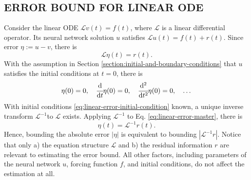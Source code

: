 \documentclass[accepted]{uai2023}
\newcommand{\dt}[1]{\cfrac{\mathrm{d} #1}{\mathrm{d} t}}
\newcommand{\dnt}[2]{\cfrac{\mathrm{d}^{#1} #2}{\mathrm{d} t^{#1}}}
\newcommand{\Err}{\eta}
\renewcommand{\L}{\mathcal{L}}
\begin{document}
\subsection{ERROR BOUND FOR LINEAR ODE}\label{section:error-bound-for-linear-odes}
    Consider the linear ODE $\L v(t) = f(t)$, where $\L$ is a linear differential operator. 
    Its neural network solution $u$ satisfies $\L u(t) = f(t) + r(t)$. 
    Since error $\Err := u - v$, there is
    {   
        \vspace{-0.5em}
        \small
        \begin{equation} \label{eq:linear-error-master}
            \L \Err(t) = r(t).
        \end{equation}
    }
    With the assumption in Section \ref{section:initial-and-boundary-conditions} that $u$ satisfies the initial conditions at $t=0$, there is
    {
        \vspace{-0.5em}
        \small
        \begin{equation} \label{eq:linear-error-initial-condition}
            \Err(0) = 0, \quad \dt{}{}\Err(0) = 0, \quad \dnt{2}{}\Err(0) = 0, \quad \dots 
        \end{equation}
    }
    With initial conditions \ref{eq:linear-error-initial-condition} known, a unique inverse transform $\L^{-1}$to $\L$ exists. 
    Applying $\L^{-1}$ to Eq. \ref{eq:linear-error-master}, there is 
    {
        \vspace{-0.5em}
        \small
        \begin{equation}\label{eq:linear-error-inverse-master}
            \Err(t) = \L^{-1} r(t).
        \end{equation}
    }
    Hence, bounding the absolute error $\left|\Err\right|$ is equivalent to bounding $\left|\L^{-1} r\right|$. 
    Notice that only a) the equation structure $\L$ and b) the residual information $r$ are relevant to estimating the error bound. 
    All other factors, including parameters of the neural network $u$, forcing function $f$, and initial conditions, do not affect the estimation at all.

\end{document}

